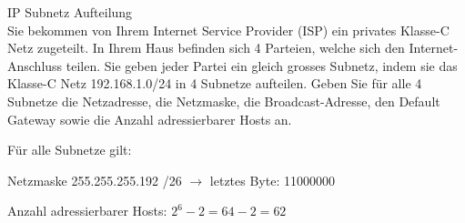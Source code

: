 \begin{example2}{IP Subnetz Aufteilung}\\
Sie bekommen von Ihrem Internet Service Provider (ISP) ein privates Klasse-C Netz zugeteilt. In Ihrem Haus befinden sich 4 Parteien, welche sich den Internet-Anschluss teilen. Sie geben jeder Partei ein gleich grosses Subnetz, indem sie das Klasse-C Netz 192.168.1.0/24 in 4 Subnetze aufteilen. Geben Sie für alle 4 Subnetze die Netzadresse, die Netzmaske, die Broadcast-Adresse, den Default Gateway sowie die Anzahl adressierbarer Hosts an.


\begin{minipage}{0.5\linewidth}
    
\end{minipage}
\begin{minipage}{0.5\linewidth}
      
\end{minipage}
  
  \vspace{1mm}

  Für alle Subnetze gilt:

  Netzmaske 255.255.255.192 /26 $\rightarrow$ letztes Byte: 11000000

  Anzahl adressierbarer Hosts: $2^{6}-2=64-2=62$
\end{example2}


